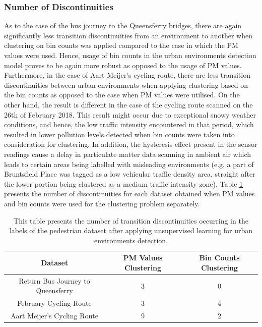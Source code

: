 \documentclass[bsc,frontabs,twoside,singlespacing, parskip,deptreport]{infthesis}     %
\begin{document}
\subsubsection*{Number of Discontinuities}

As to the case of the bus journey to the Queensferry bridges, there are again significantly less transition discontinuities from an environment to another when clustering on bin counts was applied compared to the case in which the PM values were used. Hence, usage of bin counts in the urban environments detection model proves to be again more robust as opposed to the usage of PM values. Furthermore, in the case of Aart Meijer's cycling route, there are less transition discontinuities between urban environments when applying clustering based on the bin counts as opposed to the case when PM values were utilised. On the other hand, the result is different in the case of the cycling route scanned on the 26th of February 2018. This result might occur due to exceptional snowy weather conditions, and hence, the low traffic intensity encountered in that period, which resulted in lower pollution levels detected when bin counts were taken into consideration for clustering. In addition, the hysteresis effect present in the sensor readings cause a delay in particulate matter data scanning in ambient air which leads to certain areas being labelled with misleading environments (e.g. a part of Bruntsfield Place was tagged as a low vehicular traffic density area, straight after the lower portion being clustered as a medium traffic intensity zone). Table \ref{table:discontinuities-bike-bus} presents the number of discontinuities for each dataset obtained when PM values and bin counts were used for the clustering problem separately.


\begin{table}[h!]
\centering
 \begin{tabular}{||c | c | c ||} 
 \hline
 Dataset & PM Values Clustering & Bin Counts Clustering \\ [0.5ex] 
 \hline\hline
 Return Bus Journey to Queensferry & 3 & 0 \\ 
 \hline
 February Cycling Route & 3 & 4 \\
 \hline
 Aart Meijer's Cycling Route & 9 & 2 \\
 \hline
\end{tabular}
\caption{This table presents the number of transition discontinuities occurring in the labels of the pedestrian dataset after applying unsupervised learning for urban environments detection.}
\label{table:discontinuities-bike-bus}
\end{table}
\end{document}
